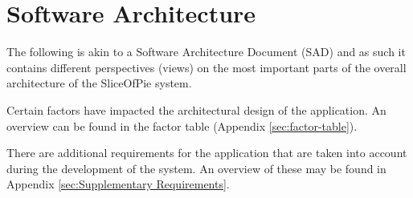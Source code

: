 \section{Software Architecture}

The following is akin to a Software Architecture Document (SAD) \cite[p.~655-659]{Larman2011} and as such
it contains different perspectives (views) on the most important parts of the overall architecture
of the SliceOfPie system.

Certain factors have impacted the architectural design of the application. An overview can be found in the factor
table (Appendix \ref{sec:factor-table}).

There are additional requirements for the application that are taken into account during the development
of the system. An overview of these may be found in Appendix \ref{sec:Supplementary Requirements}.















